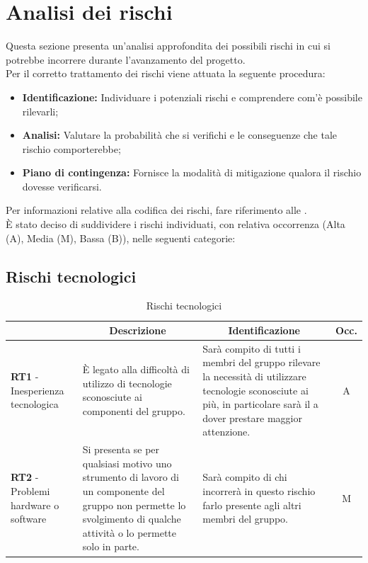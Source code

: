 \section{Analisi dei rischi} \label{section:analisi_dei_rischi}
Questa sezione presenta un'analisi approfondita dei possibili rischi in cui si potrebbe incorrere durante l'avanzamento del progetto.\\
Per il corretto trattamento dei rischi viene attuata la seguente procedura:
\begin{itemize}
  \item \textbf{Identificazione:} Individuare i potenziali rischi e comprendere com'è possibile rilevarli;
  \item \textbf{Analisi:} Valutare la probabilità che si verifichi e le conseguenze che tale rischio comporterebbe;
  \item \textbf{Piano di contingenza:} Fornisce la modalità di mitigazione qualora il rischio dovesse verificarsi.
\end{itemize}
Per informazioni relative alla codifica dei rischi, fare riferimento alle \docNameVersionNdP{}.\\
È stato deciso di suddividere i rischi individuati, con relativa occorrenza (Alta (A), Media (M), Bassa (B)), nelle seguenti categorie:

\subsection{Rischi tecnologici} \label{subsection:rischi_tecnologici}
\begin{table}[H]
  \centering
  \renewcommand{\arraystretch}{1.8}
  \begin{tabular}{p{5.5cm}|p{5cm}|p{5cm}|c}
    \rowcolor[HTML]{125E28} 
    \multicolumn{1}{c}{\color[HTML]{FFFFFF}\textbf{Codice}}
    & \multicolumn{1}{c}{\color[HTML]{FFFFFF}\textbf{Descrizione}}
    & \multicolumn{1}{c}{\color[HTML]{FFFFFF}\textbf{Identificazione}}
    & \color[HTML]{FFFFFF}\textbf{Occ.}\\
    \hline
    \textbf{RT1} - Inesperienza tecnologica & È legato alla difficoltà di utilizzo di tecnologie sconosciute ai componenti del gruppo. & Sarà compito di tutti i membri del gruppo rilevare la necessità di utilizzare tecnologie sconosciute ai più, in particolare sarà il \roleProjectManagerLow{} a dover prestare maggior attenzione. & A \\
    \textbf{RT2} - Problemi hardware o software & Si presenta se per qualsiasi motivo uno strumento di lavoro di un componente del gruppo non permette lo svolgimento di qualche attività o lo permette solo in parte. &  Sarà compito di chi incorrerà in questo rischio farlo presente agli altri membri del gruppo. & M \\
  \end{tabular}
  \caption{Rischi tecnologici}
\end{table}


